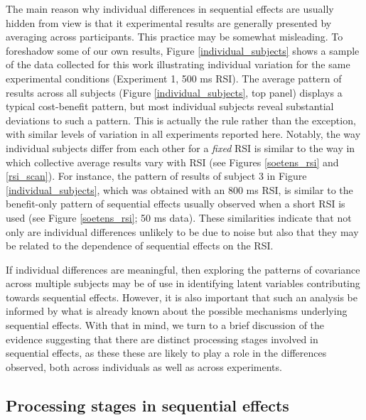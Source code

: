 \documentclass{apa}[12pt]
\begin{document}
The main reason why individual differences in sequential effects are usually hidden from view is that it experimental results are generally presented by averaging across participants. This practice may be somewhat misleading. To foreshadow some of our own results, Figure \ref{individual_subjects} shows a sample of the data collected for this work illustrating individual variation for the same experimental conditions (Experiment 1, 500 ms RSI). The average pattern of results across all subjects (Figure \ref{individual_subjects}, top panel) displays a typical cost-benefit pattern, but most individual subjects reveal substantial deviations to such a pattern. This is actually the rule rather than the exception, with similar levels of variation in all experiments reported here. Notably, the way individual subjects differ from each other for a \textit{fixed} RSI is similar to the way in which collective average results vary with RSI (see Figures \ref{soetens_rsi} and \ref{rsi_scan}). For instance, the pattern of results of subject 3 in Figure \ref{individual_subjects}, which was obtained with an 800 ms RSI, is similar to the benefit-only pattern of sequential effects usually observed when a short RSI is used (see Figure \ref{soetens_rsi}; 50 ms data). These similarities indicate that not only are individual differences unlikely to be due to noise but also that they may be related to the dependence of sequential effects on the RSI.

If individual differences are meaningful, then exploring the patterns of covariance across multiple subjects may be of use in identifying latent variables contributing towards sequential effects. However, it is also important that such an analysis be informed by what is already known about the possible mechanisms underlying sequential effects. With that in mind, we turn to a brief discussion of the evidence suggesting that there are distinct processing stages involved in sequential effects, as these these are likely to play a role in the differences observed, both across individuals as well as across experiments.

\subsection{Processing stages in sequential effects}
\end{document}
